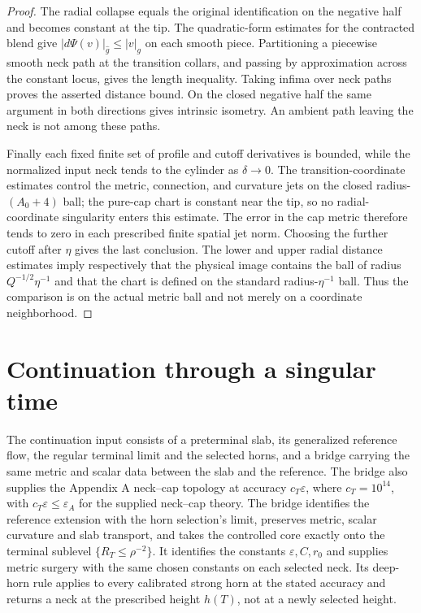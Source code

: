 \begin{proof}
The radial collapse equals the original identification on the negative
half and becomes constant at the tip.  The quadratic-form estimates
for the contracted blend give $|d\Psi(v)|_{\widehat g}\leq|v|_g$
on each smooth piece.  Partitioning a piecewise smooth neck path at
the transition collars, and passing by approximation across the
constant locus, gives the length inequality.  Taking infima over neck
paths proves the asserted distance bound.  On the closed negative
half the same argument in both directions gives intrinsic isometry.
An ambient path leaving the neck is not among these paths.

Finally each fixed finite set of profile and cutoff derivatives is
bounded, while the normalized input neck tends to the cylinder as
$\delta\to0$.  The transition-coordinate estimates control the metric,
connection, and curvature jets on the closed radius-$(A_0+4)$ ball;
the pure-cap chart is constant near the tip, so no radial-coordinate
singularity enters this estimate.  The error in the cap metric therefore
tends to zero in each prescribed finite spatial jet norm.  Choosing the
further cutoff after $\eta$ gives the last conclusion.  The lower and
upper radial distance estimates imply respectively that the physical
image contains the ball of radius $Q^{-1/2}\eta^{-1}$ and that the chart
is defined on the standard radius-$\eta^{-1}$ ball.  Thus the comparison
is on the actual metric ball and not merely on a coordinate neighborhood.
\end{proof}

\section{Continuation through a singular time}
\label{sec:surgery-continuation}

The continuation input consists of a preterminal slab, its generalized reference flow,
the regular terminal limit and the selected horns, and a bridge carrying the
same metric and scalar data between the slab and the reference.  The bridge
also supplies the Appendix A neck--cap topology at accuracy
$c_T\varepsilon$, where $c_T=10^{14}$, with
$c_T\varepsilon\leq\varepsilon_A$ for the supplied neck--cap theory.
The bridge identifies the reference extension with the horn selection's
limit, preserves metric, scalar curvature and slab transport, and takes
the controlled core exactly onto the terminal sublevel
$\{R_T\leq\rho^{-2}\}$.  It identifies the constants
$\varepsilon,C,r_0$ and supplies metric surgery with the same chosen
constants on each selected neck.  Its deep-horn rule applies to every
calibrated strong horn at the stated accuracy and returns a neck at
the prescribed height $h(T)$, not at a newly selected height.

